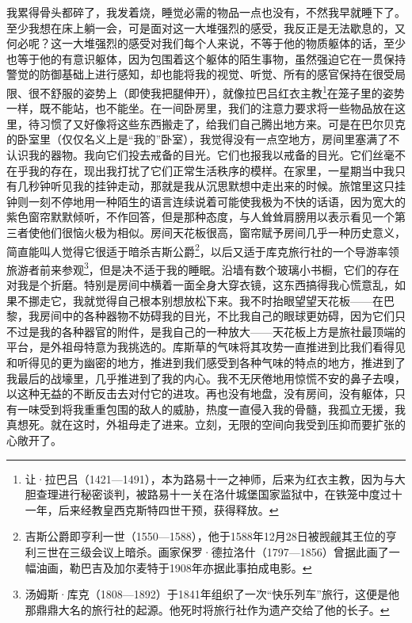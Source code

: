 \par 我累得骨头都碎了，我发着烧，睡觉必需的物品一点也没有，不然我早就睡下了。至少我想在床上躺一会，可是面对这一大堆强烈的感受，我反正是无法歇息的，又何必呢？这一大堆强烈的感受对我们每个人来说，不等于他的物质躯体的话，至少也等于他的有意识躯体，因为包围着这个躯体的陌生事物，虽然强迫它在一贯保持警觉的防御基础上进行感知，却也能将我的视觉、听觉、所有的感官保持在很受局限、很不舒服的姿势上（即使我把腿伸开），就像拉巴吕红衣主教\footnote{让·拉巴吕（1421—1491），本为路易十一之神师，后来为红衣主教，因为与大胆查理进行秘密谈判，被路易十一关在洛什城堡国家监狱中，在铁笼中度过十一年，后来经教皇西克斯特四世干预，获得释放。}在笼子里的姿势一样，既不能站，也不能坐。在一间卧房里，我们的注意力要求将一些物品放在这里，待习惯了又好像将这些东西搬走了，给我们自己腾出地方来。可是在巴尔贝克的卧室里（仅仅名义上是“我的”卧室），我觉得没有一点空地方，房间里塞满了不认识我的器物。我向它们投去戒备的目光。它们也报我以戒备的目光。它们丝毫不在乎我的存在，现出我打扰了它们正常生活秩序的模样。在家里，一星期当中我只有几秒钟听见我的挂钟走动，那就是我从沉思默想中走出来的时候。旅馆里这只挂钟则一刻不停地用一种陌生的语言连续说着可能使我极为不快的话语，因为宽大的紫色窗帘默默倾听，不作回答，但是那种态度，与人耸耸肩膀用以表示看见一个第三者使他们很恼火极为相似。房间天花板很高，窗帘赋予房间几乎一种历史意义，简直能叫人觉得它很适于暗杀吉斯公爵\footnote{吉斯公爵即亨利一世（1550—1588），他于1588年12月28日被觊觎其王位的亨利三世在三级会议上暗杀。画家保罗·德拉洛什（1797—1856）曾据此画了一幅油画，勒巴吉及加尔麦特于1908年亦据此事拍成电影。}，以后又适于库克旅行社的一个导游率领旅游者前来参观\footnote{汤姆斯·库克（1808—1892）于1841年组织了一次“快乐列车”旅行，这便是他那鼎鼎大名的旅行社的起源。他死时将旅行社作为遗产交给了他的长子。}，但是决不适于我的睡眠。沿墙有数个玻璃小书橱，它们的存在对我是个折磨。特别是房间中横着一面全身大穿衣镜，这东西搞得我心慌意乱，如果不挪走它，我就觉得自己根本别想放松下来。我不时抬眼望望天花板——在巴黎，我房间中的各种器物不妨碍我的目光，不比我自己的眼球更妨碍，因为它们只不过是我的各种器官的附件，是我自己的一种放大——天花板上方是旅社最顶端的平台，是外祖母特意为我挑选的。库斯草的气味将其攻势一直推进到比我们看得见和听得见的更为幽密的地方，推进到我们感受到各种气味的特点的地方，推进到了我最后的战壕里，几乎推进到了我的内心。我不无厌倦地用惊慌不安的鼻子去嗅，以这种无益的不断反击去对付它的进攻。再也没有地盘，没有房间，没有躯体，只有一味受到将我重重包围的敌人的威胁，热度一直侵入我的骨髓，我孤立无援，我真想死。就在这时，外祖母走了进来。立刻，无限的空间向我受到压抑而要扩张的心敞开了。
